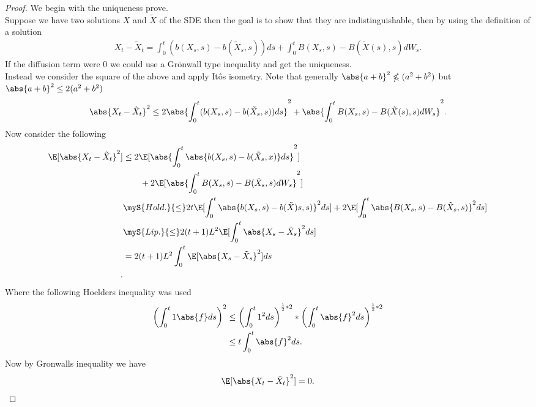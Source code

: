 \begin{proof}
  We begin with the uniqueness prove.\\[1ex] 
  Suppose we have two solutions $X$ and $\tilde{X} $ of the SDE then the goal is to show that they are indistinguishable,
  then by using the definition of a solution 
  \begin{align*}
    X_t - \tilde{X}_t = \int_0^{t} (b(X_s,s) - b(\tilde{X}_s,s )) ds + \int_0^{t} B(X_s,s) - B(\tilde{X}(s),s )  dW_s
  .\end{align*}
  If the diffusion term were 0 we could use a Grönwall type inequality and get the uniqueness.\\[1ex]
  Instead we consider the square of the above and apply It\^os isometry. Note that
  generally $\abs{a+b}^2 \nleqslant  (a^2+b^2)$  but  $\abs{a+b}^2 \le  2(a^2+b^2)$
  \begin{align*}
    \abs{X_t - \tilde{X}_t}^2 \le  2\abs{\int_0^{t} (b(X_s,s) - b(\tilde{X}_s,s )) ds}^2 + \abs{\int_0^{t} B(X_s,s) - B(\tilde{X}(s),s )  dW_s}^2
  .\end{align*}
  Now consider the following 
  \begin{align*}
    \E[\abs{X_t-\tilde{X}_t}^2] &\le 2\E[\abs{\int_0^{t} \abs{b(X_s,s) - b(\tilde{X}_s,x )} ds}^2 ]  \\
                                & \qquad + 2 \E[\abs{\int_0^{t} B(X_s,s) - B(\tilde{X}_s,s ) dW_s}^2]\\
                                &\myS{Hold.}{\le } 2t \E[\int_0^{t} \abs{b(X_s,s) - b(\tilde{X})s,s )}^2 ds ] + 2\E[\int_0^{t} \abs{B(X_s,s)-B(\tilde{X}_s,s )}^2 ds ] \\
                                &\myS{Lip.}{\le } 2(t+1)L^2 \E[\int_0^{t} \abs{X_s-\tilde{X}_s }^2 ds ]\\
                                &= 2(t+1)L^2 \int_0^{t} \E[\abs{X_s-\tilde{X}_s }^2  ]ds\\
  .\end{align*}
 Where the following Hoelders inequality was used 
 \begin{align*}
   \left( \int_0^{t} 1 \abs{f} ds  \right)^2 &\le  \left( \int_0^{t} 1^2 ds  \right)^{\frac{1}{2}*2}*\left( \int_0^{t} \abs{f}^2 ds  \right)^{\frac{1}{2}*2}  \\
                                             &\le t \int_0^{t} \abs{f}^2 ds 
 .\end{align*}
 Now by Gronwalls inequality we have 
 \begin{align*}
   \E[\abs{X_t-\tilde{X}_t }^2] = 0
 .\end{align*}

\end{proof}
